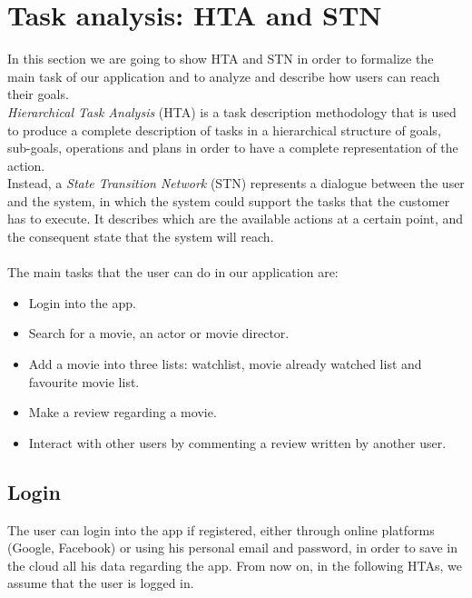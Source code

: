 \documentclass[12pt, a4paper]{article}
\numberwithin{figure}{section}
\begin{document}
\newpage

\section{Task analysis: HTA and STN}

In this section we are going to show HTA and STN in order to formalize the main task of 
our application and to analyze and describe how users can reach their goals.\\
\textit{Hierarchical Task Analysis} (HTA) is a task description methodology that is used to produce a 
complete description of tasks in a hierarchical structure of goals, sub-goals, operations and plans 
in order to have a complete representation of the action.\\
Instead, a \textit{State Transition Network} (STN) represents a dialogue between the user and the system, 
in which the system could support the tasks that the customer has to execute.
It describes which are the available actions at a certain point, and the consequent 
state that the system will reach.\\\\
The main tasks that the user can do in our application are:
\begin{itemize}
	\item Login into the app.
	\item Search for a movie, an actor or movie director.
	\item Add a movie into three lists: watchlist, movie already watched list and favourite movie list.
	\item Make a review regarding a movie.
	\item Interact with other users by commenting a review written by another user.
\end{itemize}
\hbox{}
\subsection{Login}
The user can login into the app if registered, either through online platforms (Google, Facebook) 
or using his personal email and password, in order to save in the cloud all his data regarding the app. 
From now on, in the following HTAs, we assume that the user is logged in.\\ 
\end{document}
